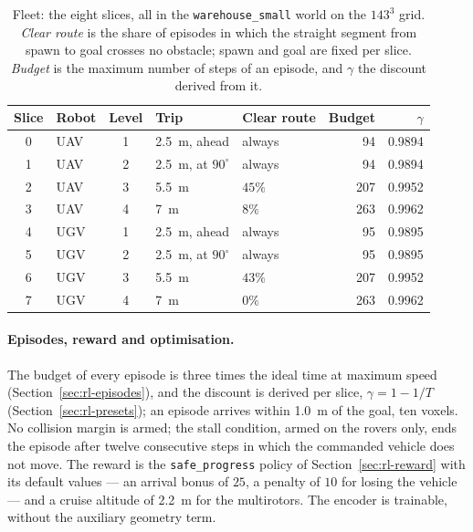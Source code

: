 \begin{table}[htbp]
  \centering
  \small
  \caption{Fleet: the eight slices, all in the \texttt{warehouse\_small} world
  on the $143^3$ grid. \emph{Clear route} is the share of episodes in which the
  straight segment from spawn to goal crosses no obstacle; spawn and goal are
  fixed per slice. \emph{Budget} is the maximum number of steps of an episode,
  and $\gamma$ the discount derived from it.}
  \label{tab:res-fleet-slices}
  \begin{tabular}{@{}clcllrr@{}}
    \toprule
    \textbf{Slice} & \textbf{Robot} & \textbf{Level} & \textbf{Trip} & \textbf{Clear route} & \textbf{Budget} & $\gamma$ \\
    \midrule
    0 & UAV & 1 & \SI{2.5}{\metre}, ahead & always & 94  & 0.9894 \\
    1 & UAV & 2 & \SI{2.5}{\metre}, at $90^\circ$ & always & 94  & 0.9894 \\
    2 & UAV & 3 & \SI{5.5}{\metre} & $45\%$ & 207 & 0.9952 \\
    3 & UAV & 4 & \SI{7}{\metre}   & $8\%$  & 263 & 0.9962 \\
    4 & UGV & 1 & \SI{2.5}{\metre}, ahead & always & 95  & 0.9895 \\
    5 & UGV & 2 & \SI{2.5}{\metre}, at $90^\circ$ & always & 95  & 0.9895 \\
    6 & UGV & 3 & \SI{5.5}{\metre} & $43\%$ & 207 & 0.9952 \\
    7 & UGV & 4 & \SI{7}{\metre}   & $0\%$  & 263 & 0.9962 \\
    \bottomrule
  \end{tabular}
\end{table}

\paragraph{Episodes, reward and optimisation.}
The budget of every episode is three times the ideal time at maximum speed
(Section~\ref{sec:rl-episodes}), and the discount is derived per slice,
$\gamma = 1 - 1/T$ (Section~\ref{sec:rl-presets}); an episode arrives within
\SI{1.0}{\metre} of the goal, ten voxels. No collision margin is armed; the
stall condition, armed on the rovers only, ends the episode after twelve
consecutive steps in which the commanded vehicle does not move. The reward is
the \texttt{safe\_progress} policy of Section~\ref{sec:rl-reward} with its
default values --- an arrival bonus of $25$, a penalty of $10$ for losing the
vehicle --- and a cruise altitude of \SI{2.2}{\metre} for the multirotors. The
encoder is trainable, without the auxiliary geometry term.

